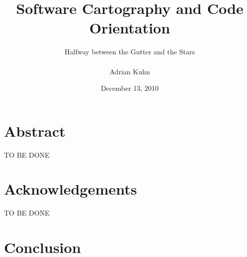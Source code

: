 \documentclass[10pt]{book}
\title{Software Cartography and Code Orientation}
\author{Halfway between the Gutter and the Stars\\~\\Adrian Kuhn}
\date{December 13, 2010}
\begin{document}
\maketitle

\chapter*{Abstract}
TO BE DONE

\chapter*{Acknowledgements}
TO BE DONE

\setcounter{tocdepth}{1}
\tableofcontents


\chapter{Conclusion}
\label{the conclusion}



\end{document}
